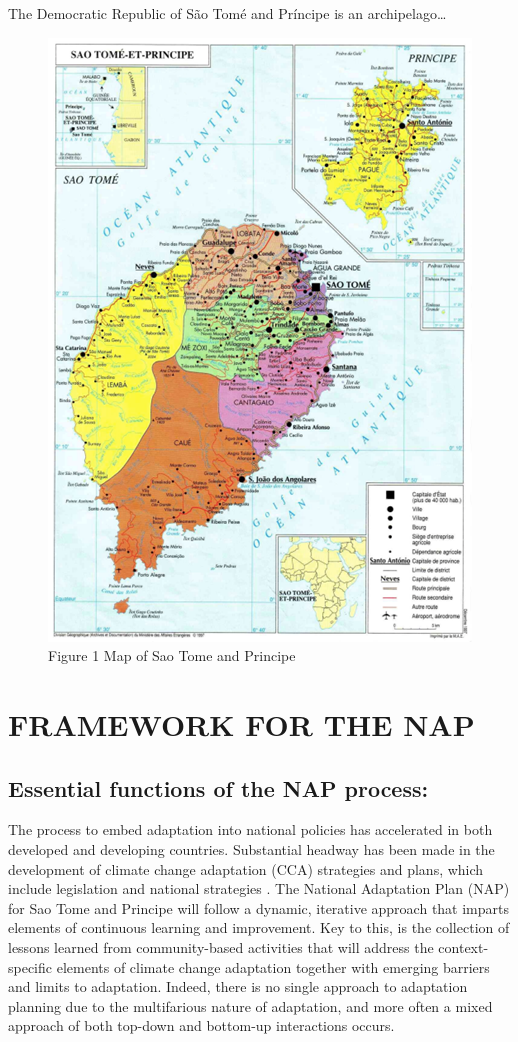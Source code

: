 \documentclass[
]{book}
\begin{document}
The Democratic Republic of São Tomé and Príncipe is an archipelago\ldots{}

\begin{figure}
\centering
\includegraphics{images/map.png}
\caption{Figure 1 Map of Sao Tome and Principe}
\end{figure}

\hypertarget{framework-for-the-nap}{%
\chapter{FRAMEWORK FOR THE NAP}\label{framework-for-the-nap}}

\hypertarget{essential-functions-of-the-nap-process}{%
\section{Essential functions of the NAP process:}\label{essential-functions-of-the-nap-process}}

The process to embed adaptation into national policies has accelerated in both developed and developing countries. Substantial headway has been made in the development of climate change adaptation (CCA) strategies and plans, which include legislation and national strategies . The National Adaptation Plan (NAP) for Sao Tome and Principe will follow a dynamic, iterative approach that imparts elements of continuous learning and improvement. Key to this, is the collection of lessons learned from community-based activities that will address the context-specific elements of climate change adaptation together with emerging barriers and limits to adaptation. Indeed, there is no single approach to adaptation planning due to the multifarious nature of adaptation, and more often a mixed approach of both top-down and bottom-up interactions occurs.
\end{document}
